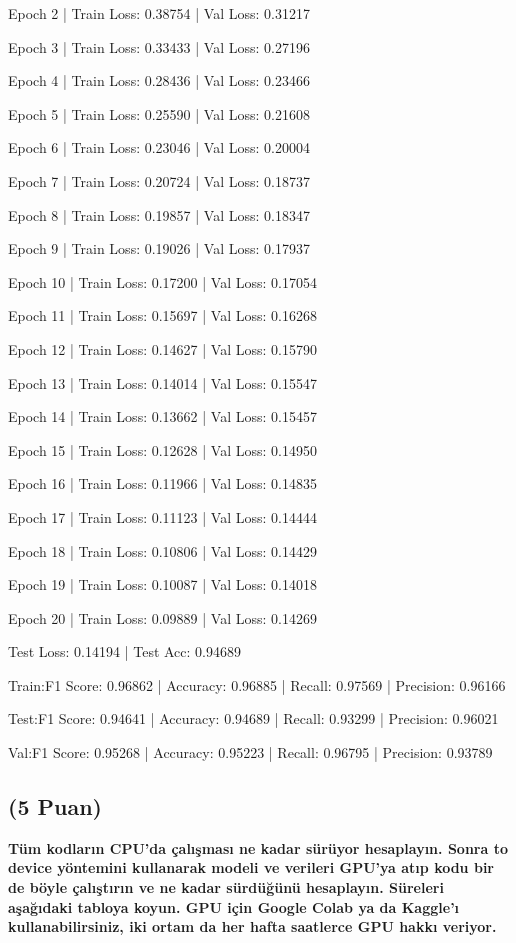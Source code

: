 \documentclass[11pt]{article}
\begin{document}
Epoch 2 | Train Loss: 0.38754 | Val Loss: 0.31217

Epoch 3 | Train Loss: 0.33433 | Val Loss: 0.27196

Epoch 4 | Train Loss: 0.28436 | Val Loss: 0.23466

Epoch 5 | Train Loss: 0.25590 | Val Loss: 0.21608

Epoch 6 | Train Loss: 0.23046 | Val Loss: 0.20004

Epoch 7 | Train Loss: 0.20724 | Val Loss: 0.18737

Epoch 8 | Train Loss: 0.19857 | Val Loss: 0.18347

Epoch 9 | Train Loss: 0.19026 | Val Loss: 0.17937

Epoch 10 | Train Loss: 0.17200 | Val Loss: 0.17054

Epoch 11 | Train Loss: 0.15697 | Val Loss: 0.16268

Epoch 12 | Train Loss: 0.14627 | Val Loss: 0.15790

Epoch 13 | Train Loss: 0.14014 | Val Loss: 0.15547

Epoch 14 | Train Loss: 0.13662 | Val Loss: 0.15457

Epoch 15 | Train Loss: 0.12628 | Val Loss: 0.14950

Epoch 16 | Train Loss: 0.11966 | Val Loss: 0.14835

Epoch 17 | Train Loss: 0.11123 | Val Loss: 0.14444

Epoch 18 | Train Loss: 0.10806 | Val Loss: 0.14429

Epoch 19 | Train Loss: 0.10087 | Val Loss: 0.14018

Epoch 20 | Train Loss: 0.09889 | Val Loss: 0.14269

Test Loss: 0.14194 | Test Acc: 0.94689

Train:F1 Score: 0.96862 | Accuracy: 0.96885 | Recall: 0.97569 | Precision: 0.96166

Test:F1 Score: 0.94641 | Accuracy: 0.94689 | Recall: 0.93299 | Precision: 0.96021

Val:F1 Score: 0.95268 | Accuracy: 0.95223 | Recall: 0.96795 | Precision: 0.93789

\subsection{(5 Puan)} \textbf{Tüm kodların CPU'da çalışması ne kadar sürüyor hesaplayın. Sonra to device yöntemini kullanarak modeli ve verileri GPU'ya atıp kodu bir de böyle çalıştırın ve ne kadar sürdüğünü hesaplayın. Süreleri aşağıdaki tabloya koyun. GPU için Google Colab ya da Kaggle'ı kullanabilirsiniz, iki ortam da her hafta saatlerce GPU hakkı veriyor.}
\end{document}
